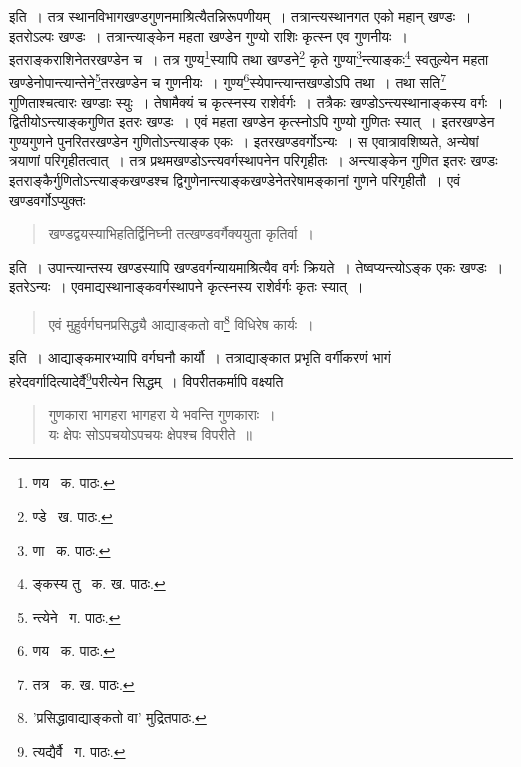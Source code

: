 \documentclass[11pt, openany]{book}
\begin{document}
{\noindent इति~। तत्र स्थानविभागखण्डगुणनमाश्रित्यैतन्निरूपणीयम्~। तत्रान्त्यस्थानगत एको महान् खण्डः~। इतरोऽल्पः खण्डः~। तत्रान्त्याङ्केन महता खण्डेन गुण्यो राशिः कृत्स्न एव गुणनीयः~। इतराङ्कराशिनेतरखण्डेन च~। तत्र गुण्य\renewcommand{\thefootnote}{१}\footnote{णय \textendash\ क. पाठः.}स्यापि तथा खण्डने\renewcommand{\thefootnote}{२}\footnote{ण्डे \textendash\ ख. पाठः.} कृते गुण्या\renewcommand{\thefootnote}{३}\footnote{णा \textendash\ क. पाठः.}न्त्याङ्कः\renewcommand{\thefootnote}{४}\footnote{ङ्कस्य तु \textendash\ क. ख. पाठः.} स्वतुल्येन महता खण्डेनोपान्त्यान्तेने\renewcommand{\thefootnote}{५}\footnote{न्त्येने \textendash\ ग. पाठः.}तरखण्डेन च गुणनीयः~। गुण्य\renewcommand{\thefootnote}{६}\footnote{णय \textendash\ क. पाठः.}स्येपान्त्यान्तखण्डोऽपि तथा~। तथा सति\renewcommand{\thefootnote}{७}\footnote{तत्र \textendash\ क. ख. पाठः.} गुणिताश्चत्वारः खण्डाः स्युः~। तेषामैक्यं च कृत्स्नस्य राशेर्वर्गः~। तत्रैकः खण्डोऽन्त्यस्थानाङ्कस्य वर्गः~। द्वितीयोऽन्त्याङ्कगुणित इतरः
खण्डः~। एवं महता खण्डेन कृत्स्नोऽपि गुण्यो गुणितः स्यात्~। इतरखण्डेन गुण्यगुणने पुनरितरखण्डेन गुणितोऽन्त्याङ्क एकः~। इतरखण्डवर्गोऽन्यः~। स एवात्रावशिष्यते, अन्येषां त्रयाणां परिगृहीतत्वात्~। तत्र प्रथमखण्डोऽन्त्यवर्गस्थापनेन परिगृहीतः~। अन्त्याङ्केन गुणित इतरः खण्डः इतराङ्कैर्गुणितोऽन्त्याङ्कखण्डश्च द्विगुणेनान्त्याङ्कखण्डेनेतरेषामङ्कानां गुणने परिगृहीतौ~। एवं खण्डवर्गोऽप्युक्तः\textendash 

\begin{quote}
{\qt खण्डद्वयस्याभिहतिर्द्विनिघ्नी तत्खण्डवर्गैक्ययुता कृतिर्वा~।}
\end{quote}

\noindent इति~। उपान्त्यान्तस्य खण्डस्यापि खण्डवर्गन्यायमाश्रित्यैव वर्गः क्रियते~। तेष्वप्यन्त्योऽङ्क एकः खण्डः~। इतरेऽन्यः~। एवमाद्यस्थानाङ्कवर्गस्थापने कृत्स्नस्य राशेर्वर्गः कृतः स्यात्~। 

\begin{quote}
{\qt एवं मुहुर्वर्गघनप्रसिद्ध्यै आद्याङ्कतो वा\renewcommand{\thefootnote}{*}\footnote{'प्रसिद्धावाद्याङ्कतो वा' मुद्रितपाठः.} विधिरेष कार्यः~।}
\end{quote}

\noindent इति~। आद्याङ्कमारभ्यापि वर्गघनौ कार्यौ~। तत्राद्याङ्कात प्रभृति वर्गीकरणं {\qt भागं हरेदवर्गादि}त्यादेर्वै\renewcommand{\thefootnote}{८}\footnote{त्यद्यैर्वै \textendash\ ग. पाठः.}परीत्येन सिद्धम्~। विपरीतकर्मापि वक्ष्यति\textendash 

\begin{quote}
{\qt गुणकारा भागहरा भागहरा ये भवन्ति गुणकाराः~।\\
यः क्षेपः सोऽपचयोऽपचयः क्षेपश्च विपरीते~॥}
\end{quote}


}
\end{document}
